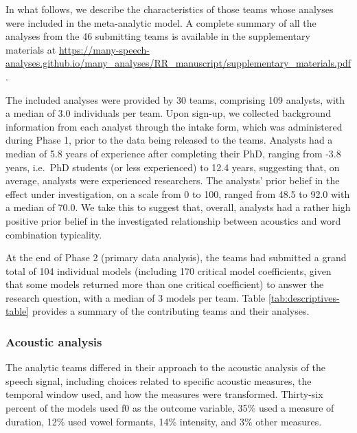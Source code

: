 \documentclass[Review,times,sageh]{sagej}
\begin{document}
In what follows, we describe the characteristics of those teams whose analyses were included in the meta-analytic model.
A complete summary of all the analyses from the 46 submitting teams is available in the supplementary materials at \url{https://many-speech-analyses.github.io/many_analyses/RR_manuscript/supplementary_materials.pdf}.

The included analyses were provided by 30 teams, comprising 109 analysts, with a median of 3.0 individuals per team.
Upon sign-up, we collected background information from each analyst through the intake form, which was administered during Phase 1, prior to the data being released to the teams.
Analysts had a median of 5.8 years of experience after completing their PhD, ranging from -3.8 years, i.e.~PhD students (or less experienced) to 12.4 years, suggesting that, on average, analysts were experienced researchers.
The analysts' prior belief in the effect under investigation, on a scale from 0 to 100, ranged from 48.5 to 92.0 with a median of 70.0.
We take this to suggest that, overall, analysts had a rather high positive prior belief in the investigated relationship between acoustics and word combination typicality.

At the end of Phase 2 (primary data analysis), the teams had submitted a grand total of 104 individual models (including 170 critical model coefficients, given that some models returned more than one critical coefficient) to answer the research question, with a median of 3 models per team.
Table \ref{tab:descriptives-table} provides a summary of the contributing teams and their analyses.

\hypertarget{acoustic-analysis}{%
\subsubsection{Acoustic analysis}\label{acoustic-analysis}}

The analytic teams differed in their approach to the acoustic analysis of the speech signal, including choices related to specific acoustic measures, the temporal window used, and how the measures were transformed.
Thirty-six percent of the models used f0 as the outcome variable, 35\% used a measure of duration, 12\% used vowel formants, 14\% intensity, and 3\% other measures.
\end{document}
